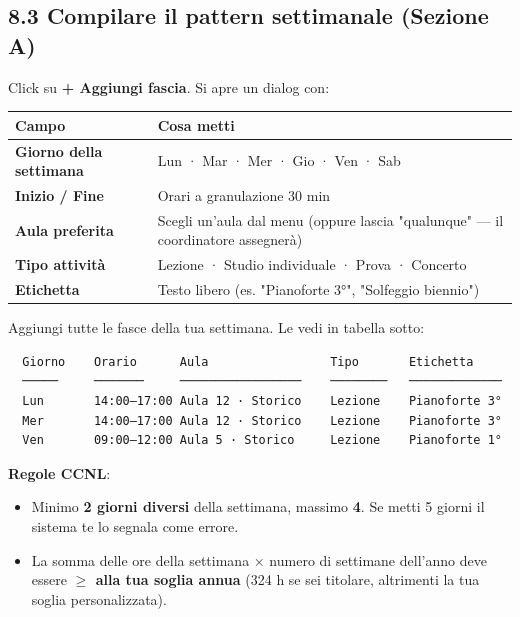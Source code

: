 \documentclass[11pt,a4paper]{article}
\begin{document}
\subsection{8.3 Compilare il pattern settimanale (Sezione A)}


Click su \textbf{+ Aggiungi fascia}. Si apre un dialog con:

\begin{table}[H]
\centering
\small
\begin{tabularx}{\linewidth}{|X|X|}
\hline
\rowcolor{tableheader} Campo & Cosa metti \\
\hline
\textbf{Giorno della settimana} & Lun · Mar · Mer · Gio · Ven · Sab \\
\hline
\textbf{Inizio / Fine} & Orari a granulazione 30 min \\
\hline
\textbf{Aula preferita} & Scegli un'aula dal menu (oppure lascia "qualunque" --- il coordinatore assegnerà) \\
\hline
\textbf{Tipo attività} & Lezione · Studio individuale · Prova · Concerto \\
\hline
\textbf{Etichetta} & Testo libero (es. "Pianoforte 3°", "Solfeggio biennio") \\
\hline
\end{tabularx}
\end{table}


Aggiungi tutte le fasce della tua settimana. Le vedi in tabella sotto:

\begin{lstlisting}
  Giorno    Orario      Aula                 Tipo       Etichetta
  ─────     ───────     ─────────────────    ────────   ─────────────
  Lun       14:00–17:00 Aula 12 · Storico    Lezione    Pianoforte 3°
  Mer       14:00–17:00 Aula 12 · Storico    Lezione    Pianoforte 3°
  Ven       09:00–12:00 Aula 5 · Storico     Lezione    Pianoforte 1°
\end{lstlisting}

\textbf{Regole CCNL}:

\begin{itemize}
  \item Minimo \textbf{2 giorni diversi} della settimana, massimo \textbf{4}. Se metti 5 giorni il sistema te lo segnala come errore.
  \item La somma delle ore della settimana × numero di settimane dell'anno deve essere \textbf{$\geq$ alla tua soglia annua} (324 h se sei titolare, altrimenti la tua soglia personalizzata).
\end{itemize}
\end{document}
